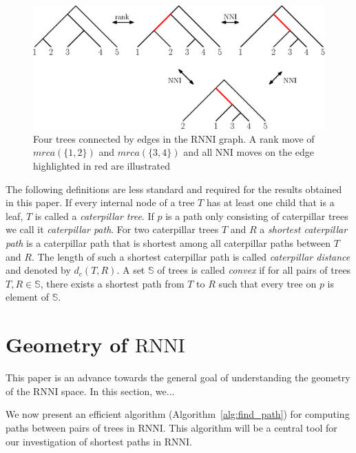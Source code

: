 \documentclass{amsart}
\newcommand{\nni}{\mathrm{NNI}}
\newcommand{\rnni}{\mathrm{RNNI}}
\begin{document}
\begin{figure}[H]
	\centering
	\includegraphics[width=\textwidth]{RNNI}
	\caption{Four trees connected by edges in the $\rnni$ graph. A rank move of $mrca(\{1,2\})$ and $mrca(\{3,4\})$ and all $\nni$ moves on the edge highlighted in red are illustrated}
	\label{fig:RNNI}
\end{figure}


The following definitions are less standard and required for the results obtained in this paper.
If every internal node of a tree $T$ has at least one child that is a leaf, $T$ is called a \emph{caterpillar tree}.
If $p$ is a path only consisting of caterpillar trees we call it \emph{caterpillar path}.
For two caterpillar trees $T$ and $R$ a \emph{shortest caterpillar path} is a caterpillar path that is shortest among all caterpillar paths between $T$ and $R$.
The length of such a shortest caterpillar path is called \emph{caterpillar distance} and denoted by $d_c(T,R)$.
A set $\mathbb S$ of trees is called \emph{convex} if for all pairs of trees $T,R \in \mathbb S$, there exists a shortest path from $T$ to $R$ such that every tree on $p$ is element of $\mathbb S$.



\section{Geometry of $\rnni$}

This paper is an advance towards the general goal of understanding the geometry of the $\rnni$ space.
In this section, we...

We now present an efficient algorithm (Algorithm~\ref{alg:find_path}) for computing paths between pairs of trees in $\rnni$.
This algorithm will be a central tool for our investigation of shortest paths in $\rnni$.
\end{document}
